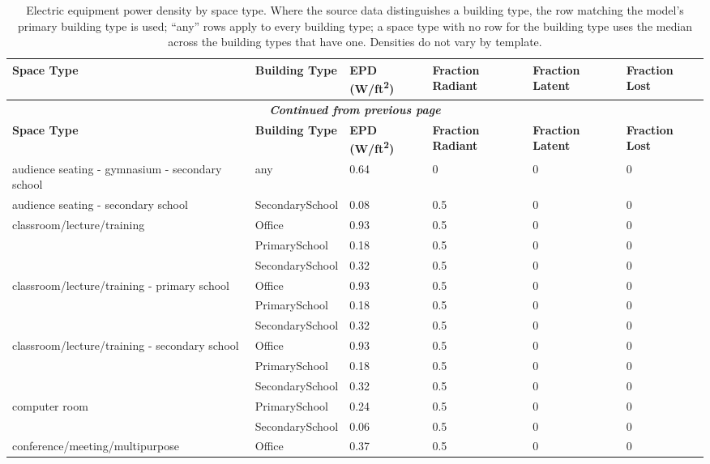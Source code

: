 \begin{center}
\scriptsize
\begin{longtable}{|p{2.2in}|p{1.3in}|p{0.7in}|p{0.6in}|p{0.6in}|p{0.6in}|}
\caption[Electric Equipment Power Density]{Electric equipment power density by space type. Where the source data distinguishes a building type, the row matching the model's primary building type is used; ``any'' rows apply to every building type; a space type with no row for the building type uses the median across the building types that have one. Densities do not vary by template.} \\ \hline
\label{tab:epds}
\textbf{Space Type} & \textbf{Building Type} & \textbf{EPD (W/ft\textsuperscript{2})} & \textbf{Fraction Radiant} & \textbf{Fraction Latent} & \textbf{Fraction Lost} \\ \hline
\endfirsthead
\multicolumn{6}{c}{{\bfseries \textit{Continued from previous page}}} \\ \hline
\textbf{Space Type} & \textbf{Building Type} & \textbf{EPD (W/ft\textsuperscript{2})} & \textbf{Fraction Radiant} & \textbf{Fraction Latent} & \textbf{Fraction Lost} \\ \hline
\endhead
audience seating - gymnasium - secondary school & any & 0.64 & 0 & 0 & 0 \\ \hline
audience seating - secondary school & SecondarySchool & 0.08 & 0.5 & 0 & 0 \\ \hline
classroom/lecture/training & Office & 0.93 & 0.5 & 0 & 0 \\ \hline
 & PrimarySchool & 0.18 & 0.5 & 0 & 0 \\ \hline
 & SecondarySchool & 0.32 & 0.5 & 0 & 0 \\ \hline
classroom/lecture/training - primary school & Office & 0.93 & 0.5 & 0 & 0 \\ \hline
 & PrimarySchool & 0.18 & 0.5 & 0 & 0 \\ \hline
 & SecondarySchool & 0.32 & 0.5 & 0 & 0 \\ \hline
classroom/lecture/training - secondary school & Office & 0.93 & 0.5 & 0 & 0 \\ \hline
 & PrimarySchool & 0.18 & 0.5 & 0 & 0 \\ \hline
 & SecondarySchool & 0.32 & 0.5 & 0 & 0 \\ \hline
computer room & PrimarySchool & 0.24 & 0.5 & 0 & 0 \\ \hline
 & SecondarySchool & 0.06 & 0.5 & 0 & 0 \\ \hline
conference/meeting/multipurpose & Office & 0.37 & 0.5 & 0 & 0 \\ \hline

\end{longtable}
\end{center}
